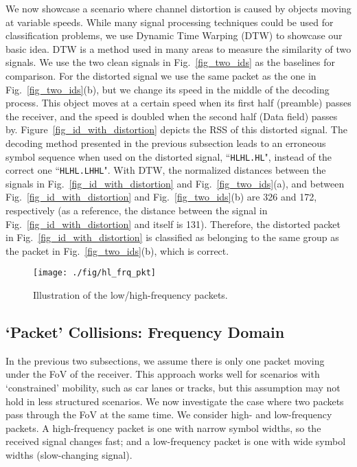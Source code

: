 \documentclass[10pt]{sig-alternate-05-2015}
\begin{document}
{We now showcase a scenario where channel distortion is caused by objects moving at variable speeds. While many signal processing techniques could be used for classification problems, we use Dynamic Time Warping (DTW) to showcase our basic idea. DTW is a method used in many areas to measure the similarity of two signals. We use the two clean signals in Fig.~\ref{fig_two_ids} as the baselines for comparison. For the distorted signal we use the same packet as the one in Fig.~\ref{fig_two_ids}(b), but we change its speed in the middle of the decoding process. This object moves at a certain speed when its first half (preamble) passes the receiver, and the speed is doubled when the second half (Data field) passes by. Figure~\ref{fig_id_with_distortion} depicts the RSS of this distorted signal. The decoding method presented in the previous subsection leads to an erroneous symbol sequence when used on the distorted signal, ``\texttt{HLHL.HL}", instead of the correct one ``\texttt{HLHL.LHHL}". With DTW, the normalized distances between the signals in Fig.~\ref{fig_id_with_distortion} and Fig.~\ref{fig_two_ids}(a), and between Fig.~\ref{fig_id_with_distortion} and Fig.~\ref{fig_two_ids}(b) are  326 and 172, respectively (as a reference, the distance between the signal in Fig.~\ref{fig_id_with_distortion} and itself is 131). Therefore, the distorted packet in Fig.~\ref{fig_id_with_distortion} is classified as belonging to the same group as the packet in Fig.~\ref{fig_two_ids}(b), which is correct.

\begin{figure}[!b]
	\centering
	\vspace{-2mm}
	\texttt{[image: ./fig/hl\_frq\_pkt]}
	\vspace{-2mm}
	\caption {Illustration of the low/high-frequency packets.}
	\vspace{-1mm}
	\label{fig_hl_frq_pkt}
\end{figure}

\subsection{`Packet' Collisions: Frequency Domain}
In the previous two subsections, we assume there is only one packet moving under the FoV of the receiver. This approach works well for scenarios with `constrained' mobility, such as car lanes or tracks, but this assumption may not hold in less structured scenarios.
We now investigate the case where two packets pass through the FoV at the same time. We consider high- and low-frequency packets. A high-frequency packet is one with narrow symbol widths, so the received signal changes fast; and a low-frequency packet is one with wide symbol widths (slow-changing signal). 

}
\end{document}
